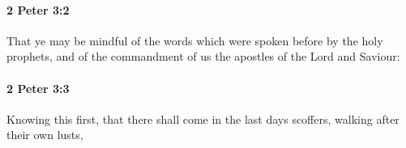 		\paragraph{2 Peter 3:2} %
			\label{2PETER-3-2}

			That ye may be mindful of the words which were spoken before by the holy prophets, and of the commandment of us the apostles of the Lord and Saviour:

			\begin{framed}
			\scriptsize
				\begin{compactdesc}
					\item[SBLG] 
				\end{compactdesc}
			\end{framed}

		\paragraph{2 Peter 3:3} %
			\label{2PETER-3-3}

			Knowing this first, that there shall come in the last days scoffers, walking after their own lusts,

